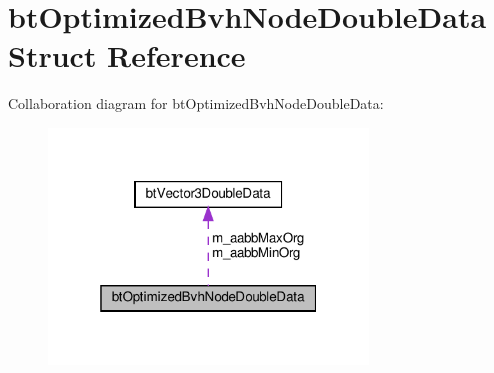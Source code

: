 \hypertarget{structbtOptimizedBvhNodeDoubleData}{}\section{bt\+Optimized\+Bvh\+Node\+Double\+Data Struct Reference}
\label{structbtOptimizedBvhNodeDoubleData}


Collaboration diagram for bt\+Optimized\+Bvh\+Node\+Double\+Data\+:
\nopagebreak
\begin{figure}[H]
\begin{center}
\leavevmode
\includegraphics[width=241pt]{structbtOptimizedBvhNodeDoubleData__coll__graph}
\end{center}
\end{figure}
